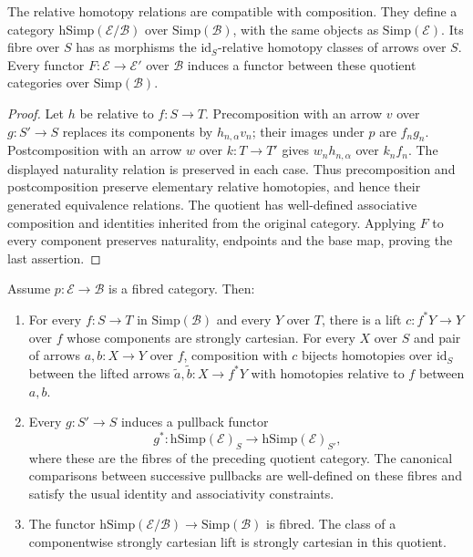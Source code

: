 \begin{lemma}
\label{lemma-illusie-I-relative-homotopy-quotient}
The relative homotopy relations are compatible with composition. They define
a category $\mathrm{hSimp}(\mathcal E/\mathcal B)$ over
$\mathrm{Simp}(\mathcal B)$, with the same objects as
$\mathrm{Simp}(\mathcal E)$. Its fibre over $S$ has as morphisms the
$\mathrm{id}_S$-relative homotopy classes of arrows over $S$.
Every functor $F:\mathcal E\to\mathcal E'$ over $\mathcal B$ induces a
functor between these quotient categories over $\mathrm{Simp}(\mathcal B)$.
\end{lemma}

\begin{proof}
Let $h$ be relative to $f:S\to T$. Precomposition with an arrow $v$
over $g:S'\to S$ replaces its components by $h_{n,\alpha}v_n$;
their images under $p$ are $f_ng_n$. Postcomposition with an arrow $w$
over $k:T\to T'$ gives $w_nh_{n,\alpha}$ over $k_nf_n$.
The displayed naturality relation is preserved in each case. Thus
precomposition and postcomposition preserve elementary relative homotopies,
and hence their generated equivalence relations. The quotient has
well-defined associative composition and identities inherited from the
original category. Applying $F$ to every component preserves naturality,
endpoints and the base map, proving the last assertion.
\end{proof}

\begin{lemma}
\label{lemma-illusie-I-relative-homotopy-base-change}
Assume $p:\mathcal E\to\mathcal B$ is a fibred category. Then:
\begin{enumerate}
\item For every $f:S\to T$ in $\mathrm{Simp}(\mathcal B)$ and every
$Y$ over $T$, there is a lift $c:f^*Y\to Y$ over $f$ whose components are
strongly cartesian. For every $X$ over $S$ and pair of arrows $a,b:X\to Y$
over $f$, composition with $c$ bijects homotopies over $\mathrm{id}_S$
between the lifted arrows $\widetilde a,\widetilde b:X\to f^*Y$ with
homotopies relative to $f$ between $a,b$.
\item Every $g:S'\to S$ induces a pullback functor
$$
g^*:\mathrm{hSimp}(\mathcal E)_S
\longrightarrow\mathrm{hSimp}(\mathcal E)_{S'},
$$
where these are the fibres of the preceding quotient category. The
canonical comparisons between successive pullbacks are well-defined on
these fibres and satisfy the usual identity and associativity constraints.
\item The functor
$\mathrm{hSimp}(\mathcal E/\mathcal B)\to\mathrm{Simp}(\mathcal B)$
is fibred. The class of a componentwise strongly cartesian lift is strongly
cartesian in this quotient.
\end{enumerate}
\end{lemma}

